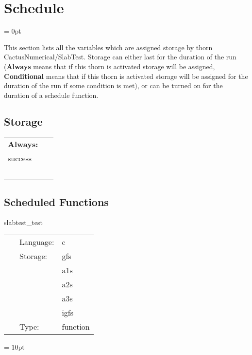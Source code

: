 
\section{Schedule} 


\parskip = 0pt


\noindent This section lists all the variables which are assigned storage by thorn CactusNumerical/SlabTest.  Storage can either last for the duration of the run ({\bf Always} means that if this thorn is activated storage will be assigned, {\bf Conditional} means that if this thorn is activated storage will be assigned for the duration of the run if some condition is met), or can be turned on for the duration of a schedule function.


\subsection*{Storage}

\hspace{5mm}

 \begin{tabular*}{160mm}{ll} 

{\bf Always:}&  ~ \\ 
 success & ~\\ 
~ & ~\\ 
\end{tabular*} 


\subsection*{Scheduled Functions}
\vspace{5mm}


\hspace{5mm} slabtest\_test 

\hspace{5mm}{\it test slab transfer routines } 


\hspace{5mm}

 \begin{tabular*}{160mm}{cll} 
~ & Language:  & c \\ 
~ & Storage:  & gfs \\ 
~& ~ &a1s\\ 
~& ~ &a2s\\ 
~& ~ &a3s\\ 
~& ~ &igfs\\ 
~ & Type:  & function \\ 
\end{tabular*} 



\vspace{5mm}\parskip = 10pt 
